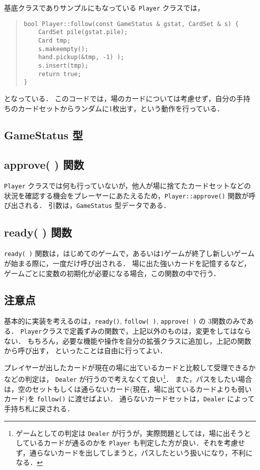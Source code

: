 基底クラスでありサンプルにもなっている \verb+Player+ クラスでは，
\begin{quote}
\begin{verbatim}
bool Player::follow(const GameStatus & gstat, CardSet & s) {
    CardSet pile(gstat.pile);
    Card tmp;
    s.makeempty();
    hand.pickup(&tmp, -1) );
    s.insert(tmp);
    return true;
}
\end{verbatim}
\end{quote}
となっている．
このコードでは，場のカードについては考慮せず，自分の手持ちのカードセットからランダムに1枚出す，という動作を行っている．

\subsection{GameStatus 型}

\subsection{approve( ) 関数}
\verb+Player+ クラスでは何も行っていないが，他人が場に捨てたカードセットなどの状況を確認する機会をプレーヤーにあたえるため，\verb+Player::approve()+ 関数が呼び出される．
引数は，\verb+GameStatus+ 型データである．

\subsection{ready( ) 関数}
\verb+ready( )+ 関数は，はじめてのゲームで，あるいは1ゲームが終了し新しいゲームが始まる際に，一度だけ呼び出される．
場に出た強いカードを記憶するなど，ゲームごとに変数の初期化が必要になる場合，この関数の中で行う．

\subsection{注意点}
基本的に実装を考えるのは，\verb+ready()+, \verb+follow( )+, \verb+approve( )+ の 3関数のみである．
\verb+Player+クラスで定義ずみの関数で，上記以外のものは，変更をしてはならない．
もちろん，必要な機能や操作を自分の拡張クラスに追加し，上記の関数から呼び出す，
といったことは自由に行ってよい．

プレイヤーが出したカードが現在の場に出ているカードと比較して受理できるかなどの判定は， \verb+Dealer+ が行うので考えなくて良い\footnote{ゲームとしての判定は \verb+Dealer+ が行うが，実際問題としては，場に出そうとしているカードが通るのかを \verb+Player+ も判定した方が良い．それを考慮せず，通らないカードを出してしまうと，パスしたという扱いになり，不利になる．}．
また，パスをしたい場合は，空のセットもしくは通らないカード(現在，場に出ているカードよりも弱いカード)を \verb+follow()+ に渡せばよい．
通らないカードセットは，\verb+Dealer+ によって手持ち札に戻される．
 
